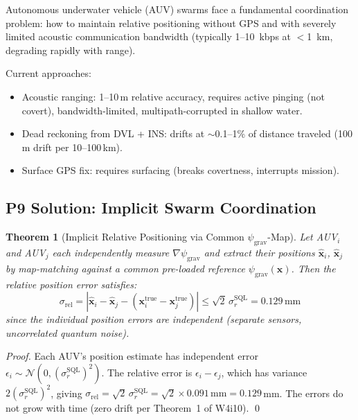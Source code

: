 \documentclass[11pt]{article}
\newtheorem{theorem}{Theorem}[section]
\theoremstyle{definition}
\theoremstyle{remark}
\newcommand{\psigrav}{\psi_{\mathrm{grav}}}
\newcommand{\SQL}{\mathrm{SQL}}
\begin{document}
Autonomous underwater vehicle (AUV) swarms face a fundamental coordination
problem: how to maintain relative positioning without GPS and with severely
limited acoustic communication bandwidth (typically 1--10~kbps at $<$1~km,
degrading rapidly with range).

Current approaches:
\begin{itemize}[nosep]
\item Acoustic ranging: 1--10\,m relative accuracy, requires active pinging
  (not covert), bandwidth-limited, multipath-corrupted in shallow water.
\item Dead reckoning from DVL + INS: drifts at $\sim$0.1--1\% of distance
  traveled (100\,m drift per 10--100\,km).
\item Surface GPS fix: requires surfacing (breaks covertness, interrupts
  mission).
\end{itemize}

\subsection{P9 Solution: Implicit Swarm Coordination}

\begin{theorem}[Implicit Relative Positioning via Common $\psigrav$-Map]
\label{thm:implicit-rel}
Let AUV$_i$ and AUV$_j$ each independently measure $\nabla\psigrav$ and
extract their positions $\hat{\mathbf{x}}_i$, $\hat{\mathbf{x}}_j$ by
map-matching against a common pre-loaded reference $\psigrav(\mathbf{x})$.
Then the relative position error satisfies:
\begin{equation}
\sigma_{\mathrm{rel}} = |\hat{\mathbf{x}}_i - \hat{\mathbf{x}}_j -
(\mathbf{x}_i^{\mathrm{true}} - \mathbf{x}_j^{\mathrm{true}})| \leq
\sqrt{2}\,\sigma_r^{\SQL} = 0.129\,\mathrm{mm}
\label{eq:relative-error}
\end{equation}
since the individual position errors are independent (separate sensors,
uncorrelated quantum noise).
\end{theorem}

\begin{proof}
Each AUV's position estimate has independent error
$\epsilon_i \sim \mathcal{N}(0, (\sigma_r^{\SQL})^2)$. The relative
error is $\epsilon_i - \epsilon_j$, which has variance
$2(\sigma_r^{\SQL})^2$, giving $\sigma_{\mathrm{rel}} =
\sqrt{2}\,\sigma_r^{\SQL} = \sqrt{2}\times 0.091\,\mathrm{mm} =
0.129$\,mm. The errors do not grow with time (zero drift per
Theorem~1 of W4i10). \qed
\end{proof}
\end{document}
